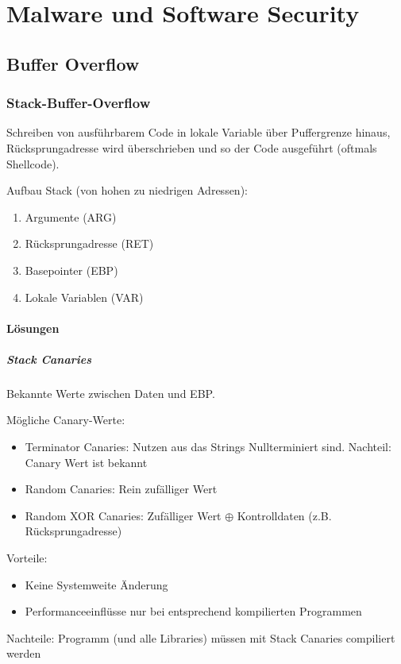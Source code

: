 \chapter{Malware und Software Security}
\section{Buffer Overflow}
\subsection{Stack-Buffer-Overflow}
Schreiben von ausführbarem Code in lokale Variable über Puffergrenze hinaus, Rücksprungadresse wird überschrieben und so der Code ausgeführt (oftmals Shellcode).

\vspace{.3cm}

Aufbau Stack (von hohen zu niedrigen Adressen):
\begin{enumerate}
    \item Argumente (ARG)
    \item Rücksprungadresse (RET)
    \item Basepointer (EBP)
    \item Lokale Variablen (VAR)
\end{enumerate}

\subsubsection{Lösungen}
\paragraph{Stack Canaries} 
Bekannte Werte zwischen Daten und EBP.

Mögliche Canary-Werte:
\begin{itemize}
    \item Terminator Canaries: Nutzen aus das Strings Nullterminiert sind. Nachteil: Canary Wert ist bekannt
    \item Random Canaries: Rein zufälliger Wert
    \item Random XOR Canaries: Zufälliger Wert $\oplus$ Kontrolldaten (z.B. Rücksprungadresse)
\end{itemize}

Vorteile:
\begin{itemize}
    \item Keine Systemweite Änderung
    \item Performanceeinflüsse nur bei entsprechend kompilierten Programmen
\end{itemize}
Nachteile: Programm (und alle Libraries) müssen mit Stack Canaries compiliert werden

